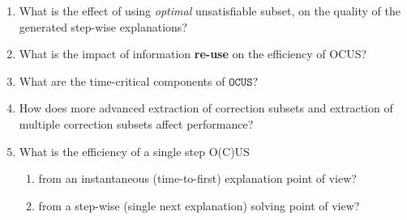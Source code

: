 \documentclass[twoside,11pt]{article}
\newcommand\comment[1]{\marginpar{\tiny #1}}
\renewcommand\comment[1]{#1}
\newcommand{\tias}[1]{{\comment{\color{blue}Tias:#1}}}
\newcommand{\emilio}[1]{{\comment{\color{red}Emilio: #1}}}
\newcommand\mm[1]{\ensuremath{#1}\xspace}
\newcommand\call[1]{\mm{\texttt{#1}}}
\newcommand\comus{\mm{\call{OCUS}}}
\begin{document}
\begin{enumerate}[label={Q\arabic*}, ref={Q\arabic*}]
\item  What is the effect of using \textit{optimal} unsatisfiable subset, on the quality of the generated step-wise explanations? \label{rq:q1}

\item What is the impact of information \textbf{re-use} on the efficiency of OCUS? \label{rq:information-reuse}

\item What are the time-critical components of \comus?\label{rq:time-critical}


\item  How does more advanced extraction of correction subsets and extraction of multiple correction subsets affect performance?\label{rq:q3}
\item   What is the efficiency of a single step O(C)US
\begin{enumerate}
	\item from an instantaneous (time-to-first) explanation  point of view?
    \item from a step-wise (single next explanation) solving point of view?
\end{enumerate} \label{rq:q4}%
\end{enumerate}
\end{document}
